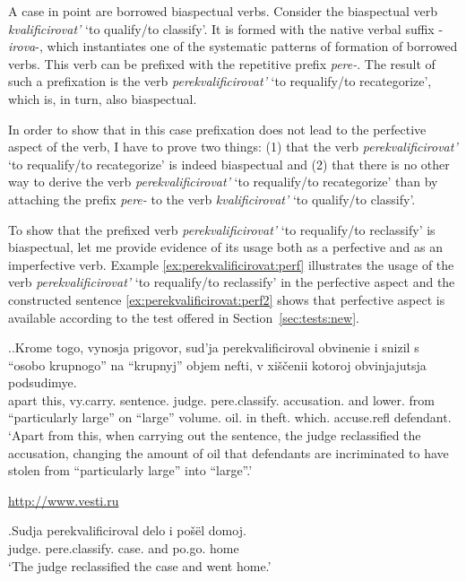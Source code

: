 A case in point are borrowed biaspectual verbs. Consider the biaspectual verb \textit{kvalificirovat'} `to qualify/to classify'. It is formed with the native verbal suffix -\textit{irova}-, which instantiates one of the systematic patterns of formation of borrowed verbs. This verb can be prefixed with the repetitive prefix \textit{pere-}. The result of such a prefixation is the verb \textit{perekvalificirovat'} `to requalify/to recategorize', which is, in turn, also biaspectual.

In order to show that in this case prefixation does not lead to the perfective aspect of the verb, I have to prove two things: (1) that the verb \textit{perekvalificirovat'} `to requalify/to recategorize' is indeed biaspectual and (2) that there is no other way to derive the verb \textit{perekvalificirovat'} `to requalify/to recategorize' than by attaching the prefix \textit{pere-} to the verb \textit{kvalificirovat'} `to qualify/to classify'.

To show that the prefixed verb \textit{perekvalificirovat'} `to requalify/to reclassify' is  biaspectual, let me provide evidence of its usage both as a perfective and as an imperfective verb. Example \ref{ex:perekvalificirovat:perf} illustrates the usage of the verb \textit{perekvalificirovat'} `to requalify/to reclassify' in the perfective aspect and the constructed sentence \ref{ex:perekvalificirovat:perf2} shows that perfective aspect is available according to the test offered in Section~\ref{sec:tests:new}.

\ex.\ag.\label{ex:perekvalificirovat:perf}Krome togo, vynosja prigovor, sud'ja perekvalificiroval obvinenie i snizil s ``osobo krupnogo'' na ``krupnyj'' objem nefti, v xi\v{s}\v{c}enii kotoroj obvinjajutsja podsudimye.\\
apart this, vy.carry. sentence. judge. pere.classify. accusation. and lower. from ``particularly large'' on ``large'' volume. oil. in theft. which. accuse.refl defendant.\\
\trans `Apart from this, when carrying out the sentence, the judge reclassified the accusation, changing the amount of oil that defendants are incriminated to have stolen from ``particularly large'' into ``large''.' 
\begin{flushright}
\vspace{-0.5em}
\url{http://www.vesti.ru}
\end{flushright}
\bg.\label{ex:perekvalificirovat:perf2}Sudja perekvalificiroval delo i po\v{s}\"{e}l domoj.\\
judge. pere.classify. case. and po.go. home\\
`The judge reclassified the case and went home.'

